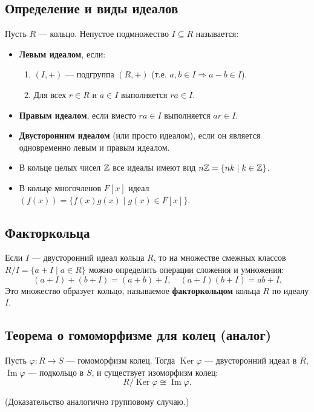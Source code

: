 \documentclass[10pt]{article}
\begin{document}
\subsection{Определение и виды идеалов}
\begin{definition}
Пусть $R$ — кольцо. Непустое подмножество $I \subseteq R$ называется:
\begin{itemize}
    \item \textbf{Левым идеалом}, если:
    \begin{enumerate}
        \item $(I, +)$ — подгруппа $(R, +)$ (т.е. $a, b \in I \Rightarrow a-b \in I$).
        \item Для всех $r \in R$ и $a \in I$ выполняется $ra \in I$.
    \end{enumerate}
    \item \textbf{Правым идеалом}, если вместо $ra \in I$ выполняется $ar \in I$.
    \item \textbf{Двусторонним идеалом} (или просто идеалом), если он является одновременно левым и правым идеалом.
\end{itemize}
\end{definition}

\begin{example}
    \begin{itemize}
        \item В кольце целых чисел $\mathbb{Z}$ все идеалы имеют вид $n\mathbb{Z} = \{nk \mid k \in \mathbb{Z}\}$.
        \item В кольце многочленов $F[x]$ идеал $(f(x)) = \{f(x)g(x) \mid g(x) \in F[x]\}$.
    \end{itemize}
\end{example}

\subsection{Факторкольца}
\begin{definition}
Если $I$ — двусторонний идеал кольца $R$, то на множестве смежных классов $R/I = \{a + I \mid a \in R\}$ можно определить операции сложения и умножения:
$$(a+I) + (b+I) = (a+b) + I, \quad (a+I)(b+I) = ab + I.$$
Это множество образует кольцо, называемое \textbf{факторкольцом} кольца $R$ по идеалу $I$.
\end{definition}

\subsection{Теорема о гомоморфизме для колец (аналог)}
\begin{theorem}
Пусть $\varphi: R \to S$ — гомоморфизм колец. Тогда $\operatorname{Ker}\varphi$ — двусторонний идеал в $R$, $\operatorname{Im}\varphi$ — подкольцо в $S$, и существует изоморфизм колец:
$$R / \operatorname{Ker}\varphi \cong \operatorname{Im}\varphi.$$
\end{theorem}
(Доказательство аналогично групповому случаю.)
\end{document}
